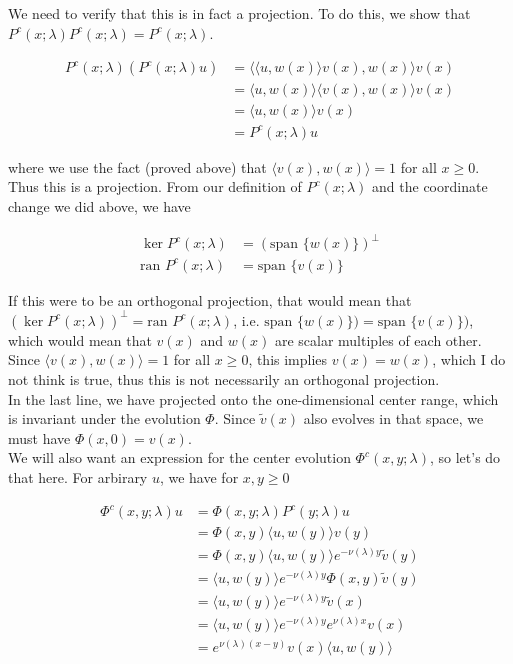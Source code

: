 \documentclass[12pt]{article}
\begin{document}
We need to verify that this is in fact a projection. To do this, we show that $P^c(x; \lambda)P^c(x; \lambda) = P^c(x; \lambda)$.

\begin{align*}
P^c(x; \lambda)( P^c(x; \lambda) u ) &= \langle \langle u, w(x) \rangle v(x), w(x) \rangle v(x) \\
&= \langle u, w(x) \rangle \langle v(x), w(x) \rangle v(x) \\
&= \langle u, w(x) \rangle v(x) \\
&= P^c(x; \lambda) u 
\end{align*}

where we use the fact (proved above) that $\langle v(x), w(x) \rangle = 1$ for all $x \geq 0$. Thus this is a projection. From our definition of $P^c(x; \lambda)$ and the coordinate change we did above, we have

\begin{align*}
\ker P^c(x; \lambda) &= ( \text{span }\{ w(x) \})^\perp\\
\text{ran } P^c(x; \lambda) &= \text{span }\{ v(x) \}
\end{align*}

If this were to be an orthogonal projection, that would mean that $(\ker P^c(x; \lambda))^
\perp = \text{ran } P^c(x; \lambda)$, i.e. $\text{span }\{ w(x) \}) = \text{span }\{ v(x) \})$, which would mean that $v(x)$ and $w(x)$ are scalar multiples of each other. Since $\langle v(x), w(x) \rangle = 1$ for all $x \geq 0$, this implies $v(x) = w(x)$, which I do not think is true, thus this is not necessarily an orthogonal projection.\\

In the last line, we have projected onto the one-dimensional center range, which is invariant under the evolution $\Phi$. Since $\tilde{v}(x)$ also evolves in that space, we must have $\Phi(x,0) = v(x)$.\\

We will also want an expression for the center evolution $\Phi^c(x,y; \lambda)$, so let's do that here. For arbirary $u$, we have for $x, y \geq 0$

\begin{align*}
\Phi^c(x,y; \lambda)u &= \Phi(x,y; \lambda) P^c(y; \lambda) u \\
&= \Phi(x,y) \langle u, w(y) \rangle v(y) \\
&= \Phi(x,y) \langle u, w(y) \rangle e^{-\nu(\lambda)y} \tilde{v}(y) \\
&= \langle u, w(y) \rangle e^{-\nu(\lambda)y} \Phi(x,y) \tilde{v}(y) \\
&= \langle u, w(y) \rangle e^{-\nu(\lambda)y} \tilde{v}(x) \\
&= \langle u, w(y) \rangle e^{-\nu(\lambda)y} e^{\nu(\lambda)x} v(x) \\
&=e^{\nu(\lambda)(x-y)} v(x) \langle u, w(y) \rangle 
\end{align*}
\end{document}
